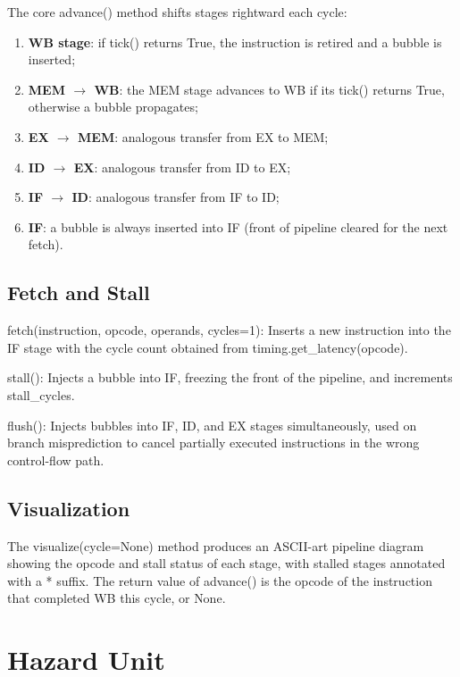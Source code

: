 \documentclass[12pt,a4paper,twoside]{book}
\theoremstyle{trinarytheorem}
\theoremstyle{trinarydefinition}
\newcommand{\code}[1]{\textsf{#1}}
\begin{document}
The core \code{advance()} method shifts stages rightward each cycle:

\begin{enumerate}
    \item \textbf{WB stage}: if \code{tick()} returns \code{True}, the
          instruction is retired and a bubble is inserted;
    \item \textbf{MEM $\rightarrow$ WB}: the MEM stage advances to WB if its
          \code{tick()} returns \code{True}, otherwise a bubble propagates;
    \item \textbf{EX $\rightarrow$ MEM}: analogous transfer from EX to MEM;
    \item \textbf{ID $\rightarrow$ EX}: analogous transfer from ID to EX;
    \item \textbf{IF $\rightarrow$ ID}: analogous transfer from IF to ID;
    \item \textbf{IF}: a bubble is always inserted into IF (front of pipeline
          cleared for the next fetch).
\end{enumerate}

\subsection{Fetch and Stall}

\noindent\code{fetch(instruction, opcode, operands, cycles=1)}: Inserts a
new instruction into the IF stage with the cycle count obtained from
\code{timing.get\_latency(opcode)}.

\noindent\code{stall()}: Injects a bubble into IF, freezing the front of
the pipeline, and increments \code{stall\_cycles}.

\noindent\code{flush()}: Injects bubbles into IF, ID, and EX stages
simultaneously, used on branch misprediction to cancel partially executed
instructions in the wrong control-flow path.

\subsection{Visualization}

The \code{visualize(cycle=None)} method produces an ASCII-art pipeline
diagram showing the opcode and stall status of each stage, with stalled
stages annotated with a \code{*} suffix. The return value of
\code{advance()} is the opcode of the instruction that completed WB this
cycle, or \code{None}.

\section{Hazard Unit}
\end{document}
